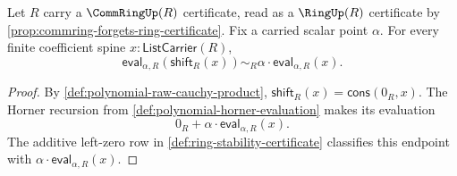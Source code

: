 \begin{lemma}
\label{lem:horner-evaluation-coefficient-shift}
Let $R$ carry a $\CommRingUp(R)$ certificate, read as a $\RingUp(R)$ certificate by \autoref{prop:commring-forgets-ring-certificate}. Fix a carried scalar point $\alpha$. For every finite coefficient spine $x:\mathsf{ListCarrier}(R)$,
$$
\mathsf{eval}_{\alpha,R}(\mathsf{shift}_R(x))\sim_R
\alpha\cdot\mathsf{eval}_{\alpha,R}(x).
$$
\end{lemma}
\begin{proof}
By \autoref{def:polynomial-raw-cauchy-product}, $\mathsf{shift}_R(x)=\mathsf{cons}(0_R,x)$. The Horner recursion from \autoref{def:polynomial-horner-evaluation} makes its evaluation
$$
0_R+\alpha\cdot\mathsf{eval}_{\alpha,R}(x).
$$
The additive left-zero row in \autoref{def:ring-stability-certificate} classifies this endpoint with $\alpha\cdot\mathsf{eval}_{\alpha,R}(x)$.
\end{proof}

